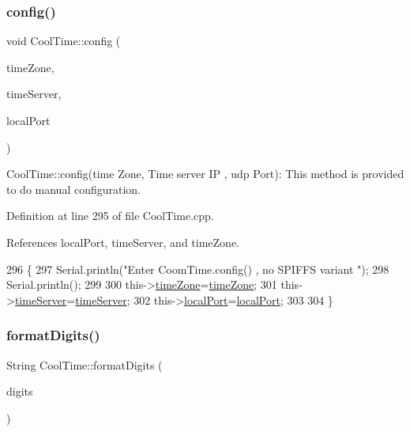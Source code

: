 \mbox{\label{classCoolTime_ae5528ed0ba9e78c711084968054950e0}} 
\subsubsection{\texorpdfstring{config()}{config()}\hspace{0.1cm}{\footnotesize\ttfamily [2/2]}}
{\footnotesize\ttfamily void Cool\+Time\+::config (\begin{DoxyParamCaption}\item[{int}]{time\+Zone,  }\item[{I\+P\+Address}]{time\+Server,  }\item[{unsigned int}]{local\+Port }\end{DoxyParamCaption})}

Cool\+Time\+::config(time Zone, Time server I\+P , udp Port)\+: This method is provided to do manual configuration. 

Definition at line 295 of file Cool\+Time.\+cpp.



References local\+Port, time\+Server, and time\+Zone.


\begin{DoxyCode}
296 \{
297     Serial.println(\textcolor{stringliteral}{"Enter CoomTime.config() , no SPIFFS variant "});
298     Serial.println();
299 
300     this->\hyperlink{classCoolTime_a1916d98810c2a4e9ba72867e8c1b9a99}{timeZone}=\hyperlink{classCoolTime_a1916d98810c2a4e9ba72867e8c1b9a99}{timeZone};
301     this->\hyperlink{classCoolTime_ad2b9858f399108cb440dd1e908916f04}{timeServer}=\hyperlink{classCoolTime_ad2b9858f399108cb440dd1e908916f04}{timeServer};
302     this->\hyperlink{classCoolTime_a2f777da44d7ba678be8185299e9b49d1}{localPort}=\hyperlink{classCoolTime_a2f777da44d7ba678be8185299e9b49d1}{localPort};
303     
304 \} 
\end{DoxyCode}
\mbox{\label{classCoolTime_acd537cd4210d7bde4e1f5c47d2ac0456}} 
\subsubsection{\texorpdfstring{format\+Digits()}{formatDigits()}}
{\footnotesize\ttfamily String Cool\+Time\+::format\+Digits (\begin{DoxyParamCaption}\item[{int}]{digits }\end{DoxyParamCaption})}


